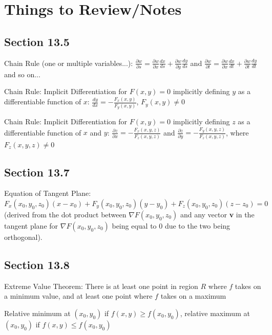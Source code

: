 \documentclass{article}
\begin{document}
\section{Things to Review/Notes}
\subsection{Section 13.5}
\par\noindent\Large Chain Rule (one or multiple variables...): $\frac{\partial w}{\partial s} = \frac{\partial w}{\partial x}\frac{dx}{ds} + \frac{\partial w}{\partial y}\frac{dy}{ds}$ and $\frac{\partial w}{\partial t} = \frac{\partial w}{\partial x}\frac{dx}{dt} + \frac{\partial w}{\partial t}\frac{dy}{dt}$ and so on...

\par\noindent\Large Chain Rule: Implicit Differentiation for $F(x, y) = 0$ implicitly defining $y$ as a differentiable function of $x$: $\frac{dy}{dx} = -\frac{F_{x}(x, y)}{F_{y}(x, y)}$, $F_{y}(x, y) \neq 0$
\par\noindent\Large Chain Rule: Implicit Differentiation for $F(x, y) = 0$ implicitly defining $z$ as a differentiable function of $x$ and $y$: $\frac{\partial z}{\partial x} = -\frac{F_{x}(x, y, z)}{F_{z}(x, y, z)}$ and $\frac{\partial z}{\partial y} = -\frac{F_{y}(x, y, z)}{F_{z}(x, y, z)}$, where $F_{z}(x, y, z) \neq 0$

\subsection{Section 13.7}
\par\noindent\large Equation of Tangent Plane: $F_{x}(x_{0}, y_{0}, z_{0})(x - x_{0}) + F_{y}(x_{0}, y_{0}, z_{0})(y - y_{0}) + F_{z}(x_{0}, y_{0}, z_{0})(z - z_{0}) = 0$ (derived from the dot product between $\nabla F(x_{0}, y_{0}, z_{0})$ and any vector \textbf{v} in the tangent plane for $\nabla F(x_{0}, y_{0}, z_{0})$ being equal to 0 due to the two being orthogonal).

\subsection{Section 13.8}
\par\noindent\large Extreme Value Theorem: There is at least one point in region $R$ where $f$ takes on a minimum value, and at least one point where $f$ takes on a maximum
\par\noindent\large Relative minimum at $(x_{0}, y_{0})$ if $f(x, y) \geq f(x_{0}, y_{0})$, relative maximum at $(x_{0}, y_{0})$ if $f(x, y) \leq f(x_{0}, y_{0})$\vspace{0.25cm}
\end{document}

